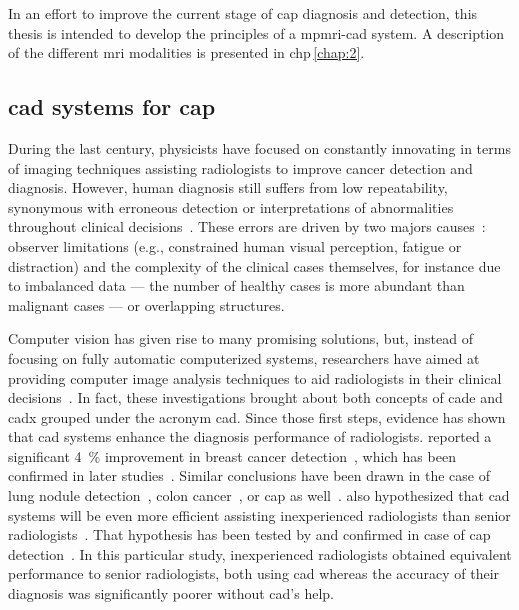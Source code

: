 In an effort to improve the current stage of \ac{cap} diagnosis and detection,
this thesis is intended to develop the principles of a \ac{mpmri}-\acs{cad}
system.
A description of the different \ac{mri} modalities is presented in
\acs{chp}\,\ref{chap:2}.

\subsection{\acs*{cad} systems for \acs*{cap}}\label{sec:intro:cad}
During the last century, physicists have focused on constantly innovating in
terms of imaging techniques assisting radiologists to improve cancer detection
and diagnosis.
However, human diagnosis still suffers from low repeatability, synonymous with
erroneous detection or interpretations of abnormalities throughout clinical
decisions~\cite{Giger2008,Hambrock2013}.
These errors are driven by two majors causes~\cite{Giger2008}: observer
limitations (e.g., constrained human visual perception, fatigue or distraction)
and the complexity of the clinical cases themselves, for instance due to
imbalanced data --- the number of healthy cases is more abundant than malignant
cases --- or overlapping structures.

Computer vision has given rise to many promising solutions, but, instead of
focusing on fully automatic computerized systems, researchers have aimed at
providing computer image analysis techniques to aid radiologists in their
clinical decisions~\cite{Giger2008}.
In fact, these investigations brought about both concepts of \ac{cade} and
\ac{cadx} grouped under the acronym \ac{cad}.
Since those first steps, evidence has shown that \ac{cad} systems enhance the
diagnosis performance of radiologists.
\citeauthor{Chan1999} reported a significant \SI{4}{\percent} improvement in
breast cancer detection~\cite{Chan1999}, which has been confirmed in later
studies~\cite{Dean2006}.
Similar conclusions have been drawn in the case of lung nodule
detection~\cite{Li2004}, colon cancer~\cite{Petrick2008}, or \ac{cap} as
well~\cite{Hambrock2013}.
\citeauthor{Chan1999} also hypothesized that \acs{cad} systems will be even
more efficient assisting inexperienced radiologists than senior
radiologists~\cite{Chan1999}.
That hypothesis has been tested by \citeauthor{Hambrock2013} and confirmed in
case of \ac{cap} detection~\cite{Hambrock2013}.
In this particular study, inexperienced radiologists obtained equivalent
performance to senior radiologists, both using \acs{cad} whereas the accuracy
of their diagnosis was significantly poorer without \ac{cad}'s help.

